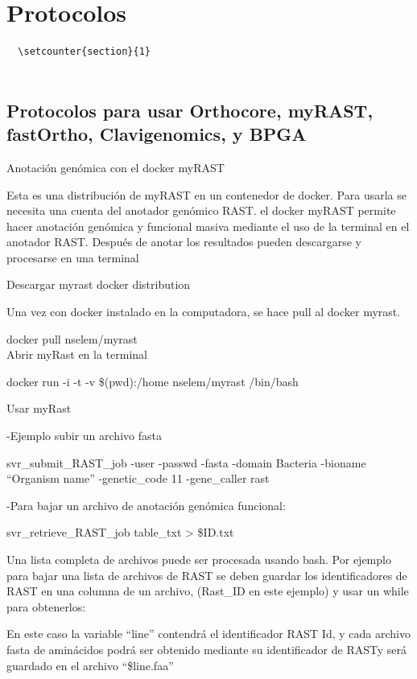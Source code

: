 \documentclass[12pt,twoside]{reedthesis}
\begin{document}
  \chapter{Protocolos}\label{protocolos}
  
  \begin{verbatim}
  \setcounter{section}{1}
                        
  \end{verbatim}
  
  \section{Protocolos para usar Orthocore, myRAST, fastOrtho,
  Clavigenomics, y
  BPGA}\label{protocolos-para-usar-orthocore-myrast-fastortho-clavigenomics-y-bpga}
  
  Anotación genómica con el docker myRAST
  
  Esta es una distribución de myRAST en un contenedor de docker. Para
  usarla se necesita una cuenta del anotador genómico RAST. el docker
  myRAST permite hacer anotación genómica y funcional masiva mediante el
  uso de la terminal en el anotador RAST. Después de anotar los resultados
  pueden descargarse y procesarse en una terminal
  
  Descargar myrast docker distribution
  
  Una vez con docker instalado en la computadora, se hace pull al docker
  myrast.
  
  docker pull nselem/myrast\\
  Abrir myRast en la terminal
  
  docker run -i -t -v \$(pwd):/home nselem/myrast /bin/bash
  
  Usar myRast
  
  -Ejemplo subir un archivo fasta
  
  svr\_submit\_RAST\_job -user -passwd -fasta -domain Bacteria -bioname
  ``Organism name'' -genetic\_code 11 -gene\_caller rast
  
  -Para bajar un archivo de anotación genómica funcional:
  
  svr\_retrieve\_RAST\_job table\_txt \textgreater{} \$ID.txt
  
  Una lista completa de archivos puede ser procesada usando bash. Por
  ejemplo para bajar una lista de archivos de RAST se deben guardar los
  identificadores de RAST en una columna de un archivo, (Rast\_ID en este
  ejemplo) y usar un while para obtenerlos:
  
  En este caso la variable ``line'' contendrá el identificador RAST Id, y
  cada archivo fasta de aminácidos podrá ser obtenido mediante su
  identificador de RASTy será guardado en el archivo ``\$line.faa''
  
\end{document}

